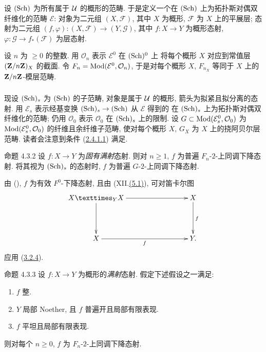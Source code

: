 \setcounter{subsubsection}{-1}
\subsubsection{}
设 $(\operatorname{Sch})$ 为所有属于 ${\mathcal U}$ 的概形的范畴.
于是定义一个在 $(\operatorname{Sch})$ 上为拓扑斯对偶双纤维化的范畴 $\mathcal{E}$:
对象为二元组 $(X,\mathcal{F})$, 其中 $X$ 为概形, $\mathcal{F}$ 为 $X$ 上的平展层;
态射为二元组 $(f,\varphi):(X,\mathcal{F})\to(Y,\mathcal{G})$,
其中 $f:X\to Y$ 为概形态射, $\varphi:\mathcal{G}\to f_{\ast}(\mathcal{F})$ 为层态射.

设 $n$ 为 $\geq0$ 的整数.
用 $\mathcal{O}_n$ 表示 $\mathcal{E}^0$ 在 $(\operatorname{Sch})^0$ 上
将每个概形 $X$ 对应到常值层 $(\mathbf{Z}/n\mathbf{Z})_X$ 的截面.
令 $F_n=\Ysheaf{\Mod}(\mathcal{E}^0,\mathcal{O}_n)$,
于是对每个概形 $X$, $F_{n_X}$ 等同于 $X$ 上的 $\mathbf{Z}/n\mathbf{Z}$-模层范畴.

\subsubsection{}
现设 $(\operatorname{Sch})_s$ 为 $(\operatorname{Sch})$ 的子范畴, 对象是属于 ${\mathcal U}$ 的概形,
箭头为拟紧且拟分离的态射.
用 $\mathcal{E}_s$ 表示经基变换 $(\Sch)_s\to(\Sch)$ 从 $\mathcal{E}$ 得到的
在 $(\operatorname{Sch})_s$ 上为拓扑斯对偶双纤维化的范畴;
仍用 $\mathcal{O}_0$ 表示 $\mathcal{O}_0$ 在 $(\operatorname{Sch})_s$ 上的限制.
设 $G\subset\Ysheaf{\Mod}(\mathcal{E}^0_s,\mathcal{O}_0)$
为 $\Ysheaf{\Mod}(\mathcal{E}^0_s,\mathcal{O}_0)$ 的纤维且余纤维子范畴,
使对每个概形 $X$, $G_X$ 为 $X$ 上的挠阿贝尔层范畴.
读者会注意到条件 (\hyperref[Vbis.par2.4.1.1]{2.4.1.1}) 满足.

\begin{enonce*}{命题 4.3.2}
设 $f:X\to Y$ 为\emph{固有满射}态射.
则对 $n\geq1$, $f$ 为普遍 $F_n$-$2$-上同调下降态射.
将其视为 $(\operatorname{Sch})_s$ 的态射时, $f$ 为普遍 $G$-$2$-上同调下降态射.
\end{enonce*}

由\pageoriginale{} (), $f$ 为有效 $F^0$-下降态射,
且由 (XII.\hyperref[XII.thm5.1]{(5.1)}), 可对笛卡尔图
\[
\xymatrix@C=3cm@R=1.5cm{
  \fprod{X}{X}{Y} \ar[r] \ar[d]& X \ar[d]^{f}\\
X   \ar[r]_{f}            & Y.
}
\]
应用 (\hyperref[Vbis.prop3.2.4]{3.2.4}).

\begin{enonce*}{命题 4.3.3}
设 $f:X\to Y$ 为概形的\emph{满射}态射. 假定下述假设之一满足:
\begin{enumerate}
\renewcommand{\theenumi}{\alph {enumi}}
\renewcommand{\labelenumi}{\theenumi)}
\item $f$ 整.

\item $Y$ 局部 Noether, 且 $f$ 普遍开且局部有限表现.

\item $f$ 平坦且局部有限表现.
\end{enumerate}
则对每个 $n\geq0$, $f$ 为 $F_n$-$2$-上同调下降态射.
\end{enonce*}

